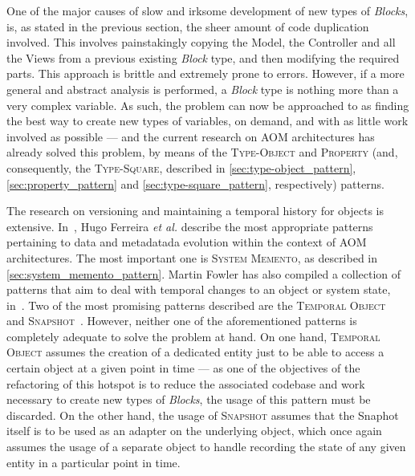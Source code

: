 One of the major causes of slow and irksome development of new types of \emph{Blocks}, is, as stated in the previous section, the sheer amount of code duplication involved. This involves painstakingly copying the Model, the Controller and all the Views from a previous existing \emph{Block} type, and then modifying the required parts. This approach is brittle and extremely prone to errors. However, if a more general and abstract analysis is performed, a \emph{Block} type is nothing more than a very complex variable. As such, the problem can now be approached to as finding the best way to create new types of variables, on demand, and with as little work involved as possible --- and the current research on AOM architectures has already solved this problem, by means of the \textsc{Type-Object} and \textsc{Property} (and, consequently, the \textsc{Type-Square}, described in \ref{sec:type-object_pattern}, \ref{sec:property_pattern} and \ref{sec:type-square_pattern}, respectively) patterns.

The research on versioning and maintaining a temporal history for objects is extensive. In~\cite{patterns_data_and_metadata_evolution_in_aoms}, Hugo Ferreira \textit{et al.} describe the most appropriate patterns pertaining to data and metadatada evolution within the context of AOM architectures. The most important one is \textsc{System Memento}, as described in \ref{sec:system_memento_pattern}. Martin Fowler has also compiled a collection of patterns that aim to deal with temporal changes to an object or system state, in~\cite{fowler_pattern_for_things_that_change_with_time}. Two of the most promising patterns described are the \textsc{Temporal Object}~\cite{fowler_temporal_object} and \textsc{Snapshot}~\cite{fowler_snapshot}. However, neither one of the aforementioned patterns is completely adequate to solve the problem at hand. On one hand, \textsc{Temporal Object} assumes the creation of a dedicated entity just to be able to access a certain object at a given point in time --- as one of the objectives of the refactoring of this hotspot is to reduce the associated codebase and work necessary to create new types of \emph{Blocks}, the usage of this pattern must be discarded. On the other hand, the usage of \textsc{Snapshot} assumes that the Snaphot itself is to be used as an adapter on the underlying object, which once again assumes the usage of a separate object to handle recording the state of any given entity in a particular point in time.


